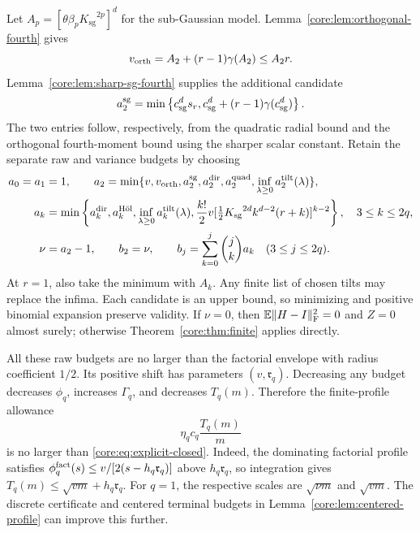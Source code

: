 \documentclass[11pt,a4paper]{article}
\theoremstyle{definition}\newtheorem{definition}[theorem]{Definition}
\theoremstyle{remark}\newtheorem{remark}[theorem]{Remark}
\numberwithin{equation}{section}
\newcommand{\Ksg}{{K_{\mathrm{sg}}}}\newcommand{\Cfour}{{C_4}}
\newcommand{\Rmom}{\mathfrak r}
\newcommand{\norm}[1]{\lVert#1\rVert}\newcommand{\ip}[2]{\langle#1,#2\rangle}
\begin{document}
Let $A_p=[\theta\beta_p\Ksg^{2p}]^d$ for the sub-Gaussian
model. Lemma~\ref{core:lem:orthogonal-fourth} gives
\begin{equation}\label{core:eq:orthogonal-v}
 v_{\rm orth}=A_2+(r-1)\gamma(A_2)\le A_2r.
\end{equation}
Lemma~\ref{core:lem:sharp-sg-fourth} supplies the additional candidate
\begin{equation}\label{core:eq:sharp-sg-variance}
 a_2^{\rm sg}=\min\left\{c_{\rm sg}^d s_r,
      c_{\rm sg}^d+(r-1)\gamma(c_{\rm sg}^d)\right\}.
\end{equation}
The two entries follow, respectively, from the quadratic radial bound
and the orthogonal fourth-moment bound using the sharper scalar
constant. Retain the separate raw and variance budgets by choosing
\begin{align}\label{core:eq:tensor-profile}
 a_0=a_1&=1,\qquad
 a_2=\min\{v,v_{\rm orth},a_2^{\rm sg},a_2^{\rm dir},a_2^{\rm quad},
                   \inf_{\lambda\ge0}a_2^{\rm tilt}(\lambda)\},\nonumber\\
 a_k&=\min\left\{a_k^{\rm dir},a_k^{\rm H\ddot{o}l},
     \inf_{\lambda\ge0}a_k^{\rm tilt}(\lambda),
     \frac{k!}{2}v[\tfrac12\Ksg^{2d}k^{d-2}(r+k)]^{k-2}\right\},
        \quad3\le k\le2q,\nonumber\\
 \nu&=a_2-1,\qquad b_2=\nu,\qquad
 b_j=\sum_{k=0}^j\binom jk a_k\quad(3\le j\le2q).
\end{align}
At $r=1$, also take the minimum with $A_k$. Any finite list of
chosen tilts may replace the infima. Each candidate is an upper bound,
so minimizing and positive binomial expansion preserve validity.
If $\nu=0$, then $\E\norm{H-I}_\F^2=0$ and $Z=0$ almost surely;
otherwise Theorem~\ref{core:thm:finite} applies directly.

All these raw budgets are no larger than the factorial envelope
with radius coefficient $1/2$. Its positive shift has parameters $(v,\Rmom_q)$.
Decreasing any budget decreases $\phi_q$, increases $\Gamma_q$, and
decreases $T_q(m)$. Therefore the finite-profile allowance
\begin{equation}\label{core:eq:profile-allowance}
 \eta_qc_q\frac{T_q(m)}m
\end{equation}
is no larger than \eqref{core:eq:explicit-closed}.
Indeed, the dominating factorial profile satisfies
$\phi_q^{\rm fact}(s)\le v/[2(s-h_q\Rmom_q)]$ above $h_q\Rmom_q$,
so integration gives $T_q(m)\le\sqrt{vm}+h_q\Rmom_q$.
For $q=1$, the respective scales are $\sqrt{\nu m}$ and $\sqrt{vm}$.
The discrete certificate and centered terminal budgets in
Lemma~\ref{core:lem:centered-profile} can improve this further.
\end{document}
